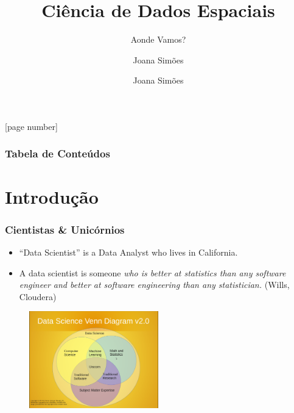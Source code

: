 \documentclass[hyperref={pdfpagelabels=true}]{beamer}
\title{Ci\^{e}ncia de Dados Espaciais}
\subtitle{Aonde Vamos?}
\author{Joana Sim\~{o}es}
\author[shortname]{Joana Sim\~{o}es \inst{1}}
\institute[shortinst]{\inst{1} Eurecat, Centro Tecnol\'{o}gico da Catalunha}
\begin{document}
[page number]

\titlepage

 
\begin{frame}
\frametitle{Tabela de Conte\'{u}dos}
\tiny{
\tableofcontents}
\end{frame}


\section{Introdu\c{c}\~{a}o} 
\begin{frame}
\frametitle{Cientistas \& Unic\'{o}rnios}
\small{ 
      \begin{itemize}    
        \item<1->``Data Scientist'' is a Data Analyst who lives in California.
        \item<1->A data scientist is someone \textit{who is better at statistics than any software engineer and better at software engineering than any statistician.} (Wills, Cloudera)
      \end{itemize}                
}
    \begin{figure}   
         \includegraphics[width=0.5\textwidth]{venn.png}   
    \end{figure}     


\end{frame}
\end{document}
